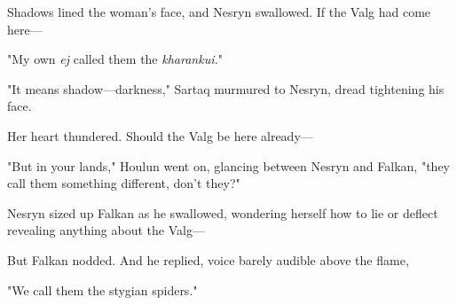Shadows lined the woman's face, and Nesryn swallowed. If the Valg had come here---

"My own \emph{ej} called them the \emph{kharankui.}"

"It means shadow---darkness," Sartaq murmured to Nesryn, dread tightening his face.

Her heart thundered. Should the Valg be here already---

"But in your lands," Houlun went on, glancing between Nesryn and Falkan, "they call them something different, don't they?"

Nesryn sized up Falkan as he swallowed, wondering herself how to lie or deflect revealing anything about the Valg---

But Falkan nodded. And he replied, voice barely audible above the flame,

"We call them the stygian spiders."

